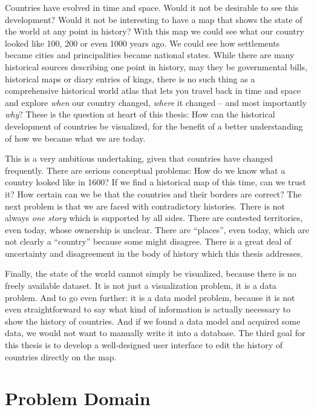 Countries have evolved in time and space. Would it not be desirable to see this development? Would it not be interesting to have a map that shows the state of the world at any point in history? With this map we could see what our country looked like 100, 200 or even 1000 years ago. We could see how settlements became cities and principalities became national states. While there are many historical sources describing one point in history, may they be governmental bills, historical maps or diary entries of kings, there is no such thing as a comprehensive historical world atlas that lets you travel back in time and space and explore \emph{when} our country changed, \emph{where} it changed -- and most importantly \emph{why}? These is the question at heart of this thesis: How can the historical development of countries be visualized, for the benefit of a better understanding of how we became what we are today.

This is a very ambitious undertaking, given that countries have changed frequently. There are serious conceptual problems: How do we know what a country looked like in 1600? If we find a historical map of this time, can we trust it? How certain can we be that the countries and their borders are correct? The next problem is that we are faced with contradictory histories. There is not always \emph{one story} which is supported by all sides. There are contested territories, even today, whose ownership is unclear. There are ``places'', even today, which are not clearly a ``country'' because some might disagree. There is a great deal of uncertainty and disagreement in the body of history which this thesis addresses.

Finally, the state of the world cannot simply be visualized, because there is no freely available dataset. It is not just a visualization problem, it is a data problem. And to go even further: it is a data model problem, because it is not even straightforward to say what kind of information is actually necessary to show the history of countries. And if we found a data model and acquired some data, we would not want to manually write it into a database. The third goal for this thesis is to develop a well-designed user interface to edit the history of countries directly on the map.


\newpage
\section{Problem Domain} %
\label{sec:problem_domain}

